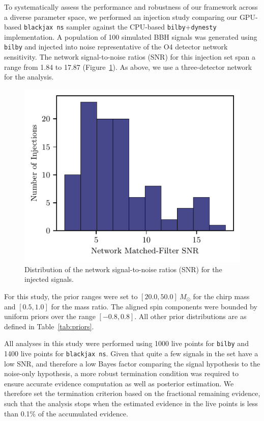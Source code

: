 \documentclass[fleqn,usenatbib]{mnras}
\begin{document}
To systematically assess the performance and robustness of our framework
across a diverse parameter space, we performed an injection study
comparing our GPU-based \texttt{blackjax ns} sampler against the
CPU-based \texttt{bilby}+\texttt{dynesty} implementation. A population
of 100 simulated BBH signals was generated using \texttt{bilby} and
injected into noise representative of the O4 detector network
sensitivity. The network signal-to-noise ratios (SNR) for this
injection set span a range from 1.84 to 17.87 (Figure~\ref{fig:snr_dist}).
As above, we use a three-detector network for the analysis.

\begin{figure}
    \centering
    \includegraphics{figures/injection_snr_hist.pdf}
    \caption{Distribution of the network signal-to-noise ratios (SNR) for the injected signals.}
    \label{fig:snr_dist}
\end{figure}


For this study, the prior ranges were set to $[20.0, 50.0]~M_{\odot}$
for the chirp mass and $[0.5, 1.0]$ for the mass ratio. The aligned
spin components were bounded by uniform priors over the range
$[-0.8, 0.8]$. All other prior distributions are as defined in
Table~\ref{tab:priors}.

All analyses in this study were performed using 1000 live points for \texttt{bilby} and
1400 live points for \texttt{blackjax ns}. Given that quite a few signals in the set have a low SNR, and therefore a
low Bayes factor comparing the signal hypothesis to the noise-only
hypothesis, a more robust termination condition was required to
ensure accurate evidence computation as well as posterior estimation.
We therefore set the termination criterion based on the fractional
remaining evidence, such that the analysis stops when the estimated
evidence in the live points is less than 0.1\% of the accumulated
evidence. 
\end{document}
